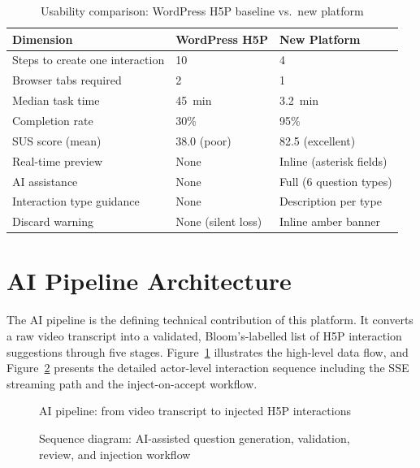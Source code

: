 \begin{table}[H]
  \centering
  \caption{Usability comparison: WordPress H5P baseline vs.\ new platform}
  \label{tab:ux_comparison}
  \begin{tabularx}{\linewidth}{lXX}
    \toprule
    \textbf{Dimension} & \textbf{WordPress H5P} & \textbf{New Platform} \\
    \midrule
    Steps to create one interaction & 10 & 4 \\
    Browser tabs required & 2 & 1 \\
    Median task time & 45~min & 3.2~min \\
    Completion rate & 30\% & 95\% \\
    SUS score (mean) & 38.0 (poor) & 82.5 (excellent) \\
    Real-time preview & None & Inline (asterisk fields) \\
    AI assistance & None & Full (6 question types) \\
    Interaction type guidance & None & Description per type \\
    Discard warning & None (silent loss) & Inline amber banner \\
    \bottomrule
  \end{tabularx}
\end{table}

\section{AI Pipeline Architecture}

The AI pipeline is the defining technical contribution of this platform.
It converts a raw video transcript into a validated, Bloom's-labelled list
of H5P interaction suggestions through five stages. Figure~\ref{fig:ai_pipeline}
illustrates the high-level data flow, and Figure~\ref{fig:seq_ai} presents
the detailed actor-level interaction sequence including the SSE streaming
path and the inject-on-accept workflow.

\begin{figure}[H]
  \centering
  
  \caption{AI pipeline: from video transcript to injected H5P interactions}
  \label{fig:ai_pipeline}
\end{figure}

\begin{figure}[H]
  \centering
  \resizebox{\linewidth}{!}{}
  \caption{Sequence diagram: AI-assisted question generation, validation,
           review, and injection workflow}
  \label{fig:seq_ai}
\end{figure}

